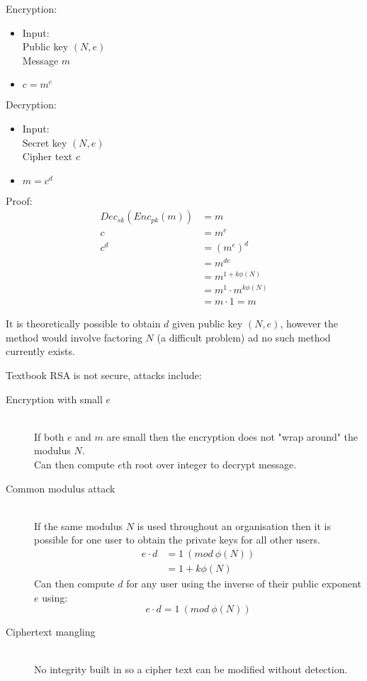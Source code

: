 \documentclass[a4paper]{article}
\begin{document}
Encryption:
\begin{itemize}
  \item
    Input: \\
    Public key $(N, e)$ \\
    Message $m$
  \item $c = m^{e}$
\end{itemize}

Decryption:
\begin{itemize}
  \item
    Input: \\
    Secret key $(N, e)$ \\
    Cipher text $c$
  \item $m = c^{d}$
\end{itemize}

Proof:
\begin{align*}
  Dec_{sk}(Enc_{pk}(m)) &= m \\
                      c &= m^{e} \\
                  c^{d} &= (m^{e})^{d} \\
                        &= m^{de} \\
                        &= m^{1 + k\phi(N)} \\
                        &= m^{1} \cdot m^{k\phi(N)} \\
                        &= m \cdot 1 = m
\end{align*}

It is theoretically possible to obtain $d$ given public key $(N, e)$, however
the method would involve factoring $N$ (a difficult problem) ad no such method
currently exists.

Textbook RSA is not secure, attacks include:
\begin{description}
  \item[Encryption with small $e$] \hfill \\
    If both $e$ and $m$ are small then the encryption does not "wrap around" the
    modulus $N$. \\
    Can then compute $e$th root over integer to decrypt message.

  \item[Common modulus attack] \hfill \\
    If the same modulus $N$ is used throughout an organisation then it is
    possible for one user to obtain the private keys for all other users.
    \begin{align*}
      e \cdot d &= 1 \: (mod \: \phi(N)) \\
                &= 1 + k\phi(N)
    \end{align*}
    Can then compute $d$ for any user using the inverse of their public exponent
    $e$ using:
    \[
      e \cdot d = 1 \: (mod \: \phi(N))
    \]

  \item[Ciphertext mangling] \hfill \\
    No integrity built in so a cipher text can be modified without detection.

\end{description}
\end{document}
